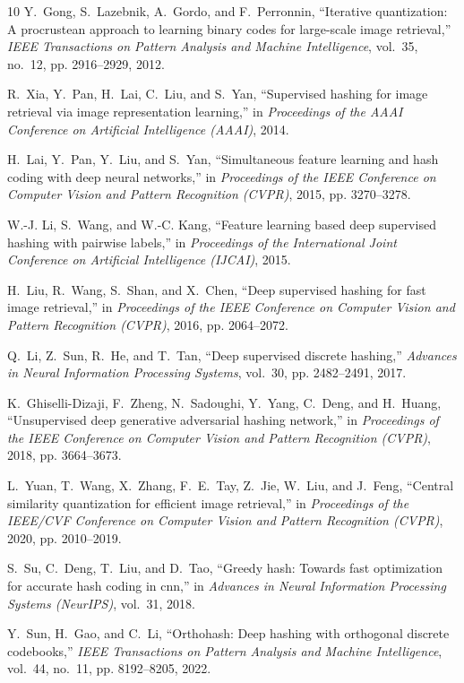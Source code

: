 \documentclass[10pt,conference]{IEEEtran}
\begin{document}
\begin{thebibliography}{10}
Y.~Gong, S.~Lazebnik, A.~Gordo, and F.~Perronnin, ``Iterative quantization: A procrustean approach to learning binary codes for large-scale image retrieval,'' \emph{IEEE Transactions on Pattern Analysis and Machine Intelligence}, vol.~35, no.~12, pp. 2916--2929, 2012.

R.~Xia, Y.~Pan, H.~Lai, C.~Liu, and S.~Yan, ``Supervised hashing for image retrieval via image representation learning,'' in \emph{Proceedings of the AAAI Conference on Artificial Intelligence (AAAI)}, 2014.

H.~Lai, Y.~Pan, Y.~Liu, and S.~Yan, ``Simultaneous feature learning and hash coding with deep neural networks,'' in \emph{Proceedings of the IEEE Conference on Computer Vision and Pattern Recognition (CVPR)}, 2015, pp. 3270--3278.

W.-J. Li, S.~Wang, and W.-C. Kang, ``Feature learning based deep supervised hashing with pairwise labels,'' in \emph{Proceedings of the International Joint Conference on Artificial Intelligence (IJCAI)}, 2015.

H.~Liu, R.~Wang, S.~Shan, and X.~Chen, ``Deep supervised hashing for fast image retrieval,'' in \emph{Proceedings of the IEEE Conference on Computer Vision and Pattern Recognition (CVPR)}, 2016, pp. 2064--2072.

Q.~Li, Z.~Sun, R.~He, and T.~Tan, ``Deep supervised discrete hashing,'' \emph{Advances in Neural Information Processing Systems}, vol.~30, pp. 2482--2491, 2017.

K.~Ghiselli-Dizaji, F.~Zheng, N.~Sadoughi, Y.~Yang, C.~Deng, and H.~Huang, ``Unsupervised deep generative adversarial hashing network,'' in \emph{Proceedings of the IEEE Conference on Computer Vision and Pattern Recognition (CVPR)}, 2018, pp. 3664--3673.

L.~Yuan, T.~Wang, X.~Zhang, F.~E.~Tay, Z.~Jie, W.~Liu, and J.~Feng, ``Central similarity quantization for efficient image retrieval,'' in \emph{Proceedings of the IEEE/CVF Conference on Computer Vision and Pattern Recognition (CVPR)}, 2020, pp. 2010--2019.

S.~Su, C.~Deng, T.~Liu, and D.~Tao, ``Greedy hash: Towards fast optimization for accurate hash coding in cnn,'' in \emph{Advances in Neural Information Processing Systems (NeurIPS)}, vol.~31, 2018.

Y.~Sun, H.~Gao, and C.~Li, ``Orthohash: Deep hashing with orthogonal discrete codebooks,'' \emph{IEEE Transactions on Pattern Analysis and Machine Intelligence}, vol.~44, no.~11, pp. 8192--8205, 2022.

\end{thebibliography}
\end{document}
